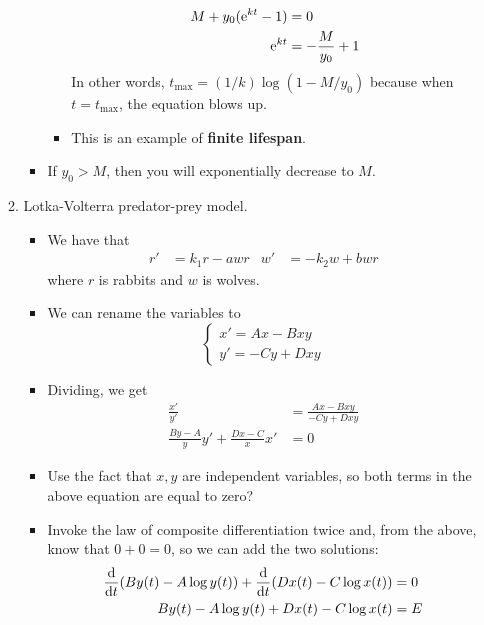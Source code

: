 \documentclass[../notes.tex]{subfiles}
\begin{document}
\begin{itemize}
\begin{enumerate}
\begin{itemize}
\begin{itemize}
                \begin{align*}
                    M+y_0(\e[kt]-1) &= 0\\
                    \e[kt] &= -\frac{M}{y_0}+1
                \end{align*}
                In other words, $t_\text{max}=(1/k)\log(1-M/y_0)$ because when $t=t_\text{max}$, the equation blows up.
                \item This is an example of \textbf{finite lifespan}.
            \end{itemize}
            \item If $y_0>M$, then you will exponentially decrease to $M$.
        \end{itemize}
        \item Lotka-Volterra predator-prey model.
        \begin{itemize}
            \item We have that
            \begin{align*}
                r' &= k_1r-awr&
                w' &= -k_2w+bwr
            \end{align*}
            where $r$ is rabbits and $w$ is wolves.
            \item We can rename the variables to
            \begin{equation*}
                \begin{cases}
                    x' = Ax-Bxy\\
                    y' = -Cy+Dxy
                \end{cases}
            \end{equation*}
            \item Dividing, we get
            \begin{align*}
                \frac{x'}{y'} &= \frac{Ax-Bxy}{-Cy+Dxy}\\
                \frac{By-A}{y}y'+\frac{Dx-C}{x}x' &= 0
            \end{align*}
            \item Use the fact that $x,y$ are independent variables, so both terms in the above equation are equal to zero?
            \item Invoke the law of composite differentiation twice and, from the above, know that $0+0=0$, so we can add the two solutions:
            \begin{align*}
                \dv{t}(By(t)-A\log y(t))+\dv{t}(Dx(t)-C\log x(t)) &= 0\\
                By(t)-A\log y(t)+Dx(t)-C\log x(t) &= E

\end{align*}
\end{itemize}
\end{enumerate}
\end{itemize}
\end{document}
